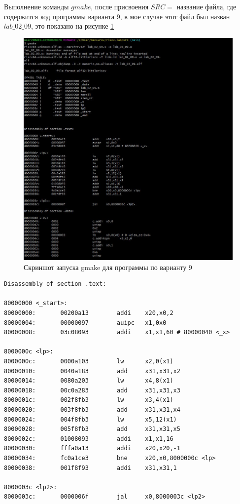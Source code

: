 Выполнение команды $gmake$, после присвоения $SRC=$ название файла, где содержится код программы варианта 9, в мое случае этот файл был назван $lab\_02\_09$, это показано на рисунке \ref{img:t1-gamake}

\begin{figure}[h]
	\centering
	\includegraphics[height=0.8\textheight]{img/t1-gmake.jpg}
	\caption{Скриншот запуска gmake для программы по варианту 9}
	\label{img:t1-gamake}
\end{figure}

\clearpage

\begin{lstlisting}[label=lst:v22,caption=Дизассемблированный код 9 варианта]
Disassembly of section .text:

80000000 <_start>:
80000000:       00200a13        addi    x20,x0,2
80000004:       00000097        auipc   x1,0x0
80000008:       03c08093        addi    x1,x1,60 # 80000040 <_x>

8000000c <lp>:
8000000c:       0000a103        lw      x2,0(x1)
80000010:       0040a183        add     x31,x31,x2
80000014:       0080a203        lw      x4,8(x1)
80000018:       00c0a283        add     x31,x31,x3
8000001c:       002f8fb3        lw      x3,4(x1)
80000020:       003f8fb3        add     x31,x31,x4
80000024:       004f8fb3        lw      x5,12(x1)
80000028:       005f8fb3        add     x31,x31,x5
8000002c:       01008093        addi    x1,x1,16
80000030:       fffa0a13        addi    x20,x20,-1
80000034:       fc0a1ce3        bne     x20,x0,8000000c <lp>
80000038:       001f8f93        addi    x31,x31,1

8000003c <lp2>:
8000003c:       0000006f        jal     x0,8000003c <lp2>
\end{lstlisting}

